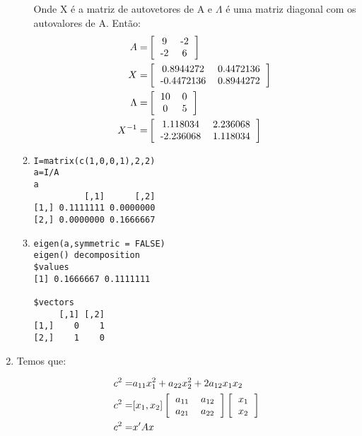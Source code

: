 \documentclass[11pt,a4paper]{book}
\begin{document}
\begin{enumerate}
\begin{enumerate}[label=\alph*)]
			Onde X é a matriz de autovetores de A e $\Lambda$ é uma matriz diagonal com os autovalores de A.
			Então:
			\begin{eqnarray*}
				A=&\left[
				\begin{tabular}{c c}
				9&-2\\
				-2&6
				\end{tabular}
				\right]\\
				X=&\left[
				\begin{tabular}{c c}
				 0.8944272 & 0.4472136\\
				-0.4472136 & 0.8944272
				\end{tabular}
				\right]\\
				\Lambda=&\left[
				\begin{tabular}{c c}
				10 & 0\\
				0 & 5
				\end{tabular}
				\right]\\
				X^{-1}=&\left[
				\begin{tabular}{c c}
				1.118034 & 2.236068\\
				-2.236068 & 1.118034
				\end{tabular}
				\right]
			\end{eqnarray*}
			
			\item
			\begin{lstlisting}
I=matrix(c(1,0,0,1),2,2)
a=I/A
a
          [,1]      [,2]
[1,] 0.1111111 0.0000000
[2,] 0.0000000 0.1666667
			\end{lstlisting}
			
			\item
			\begin{lstlisting}
eigen(a,symmetric = FALSE)
eigen() decomposition
$values
[1] 0.1666667 0.1111111

$vectors
     [,1] [,2]
[1,]    0    1
[2,]    1    0
			\end{lstlisting}
		\end{enumerate}
		
		\item
		
		Temos que:
		
		\begin{eqnarray*}
			c^2=&a_{11}x_1^2+a_{22}x_2^2+2a_{12}x_1x_2\\
			c^2=&[x_1,x_2]\left[
			\begin{tabular}{c c}
			$a_{11}$ & $a_{12}$\\
			$a_{21}$ &$ a_{22}$
			\end{tabular}
			\right]
			\left[
			\begin{tabular}{c}
			$x_1$\\
			$x_2$
			\end{tabular}
			\right]\\
			c^2=&x'Ax
		\end{eqnarray*}
		

\end{enumerate}
\end{document}

